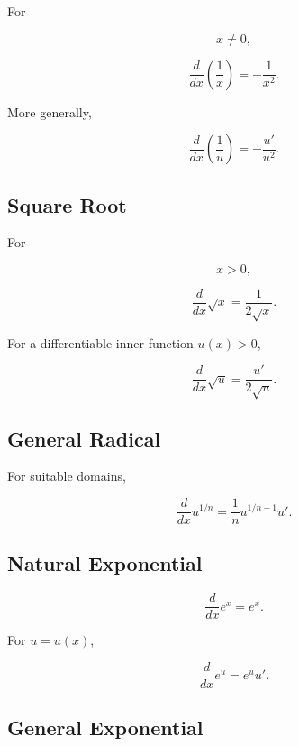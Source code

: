 For

\[
x\neq0,
\]

\[
\boxed{
\frac{d}{dx}
\left(
\frac1x
\right)
=
-\frac1{x^2}.
}
\]

More generally,

\[
\boxed{
\frac{d}{dx}
\left(
\frac1{u}
\right)
=
-\frac{u'}{u^2}.
}
\]

\subsection{Square Root}
\label{subsec:square-root-derivative-reference}

For

\[
x>0,
\]

\[
\boxed{
\frac{d}{dx}
\sqrt{x}
=
\frac{1}{2\sqrt{x}}.
}
\]

For a differentiable inner function \(u(x)>0\),

\[
\boxed{
\frac{d}{dx}
\sqrt{u}
=
\frac{u'}{2\sqrt{u}}.
}
\]

\subsection{General Radical}
\label{subsec:general-radical-derivative}

For suitable domains,

\[
\boxed{
\frac{d}{dx}
u^{1/n}
=
\frac1n
u^{1/n-1}
u'.
}
\]

\subsection{Natural Exponential}
\label{subsec:e-exponential-derivative}

\[
\boxed{
\frac{d}{dx}e^x
=
e^x.
}
\]

For \(u=u(x)\),

\[
\boxed{
\frac{d}{dx}e^u
=
e^u u'.
}
\]

\subsection{General Exponential}
\label{subsec:general-exponential-derivative}

